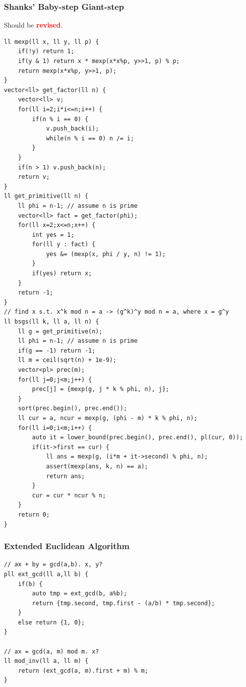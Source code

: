 \documentclass[landscape, 8pt, a4paper, oneside, twocolumn]{extarticle}
\newcommand{\revised}{Should be \textcolor{red}{\textbf{revised}}.}
\begin{document}
\subsubsection{Shanks' Baby-step Giant-step}
\revised
\begin{verbatim}
ll mexp(ll x, ll y, ll p) {
    if(!y) return 1;
    if(y & 1) return x * mexp(x*x%p, y>>1, p) % p;
    return mexp(x*x%p, y>>1, p);
}
vector<ll> get_factor(ll n) {
    vector<ll> v;
    for(ll i=2;i*i<=n;i++) {
        if(n % i == 0) {
            v.push_back(i);
            while(n % i == 0) n /= i;
        }
    }
    if(n > 1) v.push_back(n);
    return v;
}
ll get_primitive(ll n) {
    ll phi = n-1; // assume n is prime
    vector<ll> fact = get_factor(phi);
    for(ll x=2;x<=n;x++) {
        int yes = 1;
        for(ll y : fact) {
            yes &= (mexp(x, phi / y, n) != 1);
        }
        if(yes) return x;
    }
    return -1;
}
// find x s.t. x^k mod n = a -> (g^k)^y mod n = a, where x = g^y
ll bsgs(ll k, ll a, ll n) {
    ll g = get_primitive(n);
    ll phi = n-1; // assume n is prime
    if(g == -1) return -1;
    ll m = ceil(sqrt(n) + 1e-9);
    vector<pl> prec(m);
    for(ll j=0;j<m;j++) {
        prec[j] = {mexp(g, j * k % phi, n), j};
    }
    sort(prec.begin(), prec.end());
    ll cur = a, ncur = mexp(g, (phi - m) * k % phi, n);
    for(ll i=0;i<m;i++) {
        auto it = lower_bound(prec.begin(), prec.end(), pl(cur, 0));
        if(it->first == cur) {
            ll ans = mexp(g, (i*m + it->second) % phi, n);
            assert(mexp(ans, k, n) == a);
            return ans;
        }
        cur = cur * ncur % n;
    }
    return 0;
}
\end{verbatim}
\subsubsection{Extended Euclidean Algorithm}
\begin{verbatim}
// ax + by = gcd(a,b). x, y?
pll ext_gcd(ll a,ll b) {
    if(b) {
        auto tmp = ext_gcd(b, a%b);
        return {tmp.second, tmp.first - (a/b) * tmp.second};
    }
    else return {1, 0};
}

// ax = gcd(a, m) mod m. x?
ll mod_inv(ll a, ll m) {
    return (ext_gcd(a, m).first + m) % m;
}
\end{verbatim}
\end{document}
